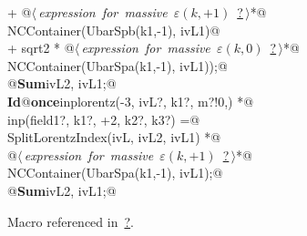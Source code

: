 \documentclass[a4paper,12pt]{amsart}
\renewcommand{\NWlink}[2]{\hyperlink{#1}{#2}}
\renewcommand{\NWtxtMacroRefIn}{Macro referenced in}
\renewcommand{\NWsep}{${\diamond}$}
\begin{document}
\begin{flushleft}
\begin{minipage}{\linewidth}
\begin{list}{}{}
\mbox{}\verb@   + @\hbox{$\langle\,${\it expression for massive $\varepsilon(k, +1)$}\nobreak\ {\footnotesize \NWlink{nuweb?}{?}}$\,\rangle$}\verb@ *@\\
\mbox{}\verb@     NCContainer(UbarSpb(k1,-1), ivL1)@\\
\mbox{}\verb@   + sqrt2 * @\hbox{$\langle\,${\it expression for massive $\varepsilon(k, 0)$}\nobreak\ {\footnotesize \NWlink{nuweb?}{?}}$\,\rangle$}\verb@ *@\\
\mbox{}\verb@     NCContainer(UbarSpa(k1,-1), ivL1));@\\
\mbox{}\verb@   @\hbox{\sffamily\bfseries Sum}\verb@ ivL2, ivL1;@\\
\mbox{}\verb@@\hbox{\sffamily\bfseries Id}\verb@ @\hbox{\sffamily\bfseries once}\verb@ inplorentz(-3, ivL?, k1?, m?!{0,}) *@\\
\mbox{}\verb@      inp(field1?, k1?, +2, k2?, k3?) =@\\
\mbox{}\verb@   SplitLorentzIndex(ivL, ivL2, ivL1) *@\\
\mbox{}\verb@   @\hbox{$\langle\,${\it expression for massive $\varepsilon(k, +1)$}\nobreak\ {\footnotesize \NWlink{nuweb?}{?}}$\,\rangle$}\verb@ *@\\
\mbox{}\verb@   NCContainer(UbarSpa(k1,-1), ivL1);@\\
\mbox{}\verb@   @\hbox{\sffamily\bfseries Sum}\verb@ ivL2, ivL1;@\\
\mbox{}\verb@@{\NWsep}
\end{list}
\vspace{-1.5ex}
\footnotesize
\begin{list}{}{\setlength{\itemsep}{-\parsep}\setlength{\itemindent}{-\leftmargin}}
\item \NWtxtMacroRefIn\ \NWlink{nuweb?}{?}.

\item{}
\end{list}
\end{minipage}\vspace{4ex}
\end{flushleft}
\end{document}
